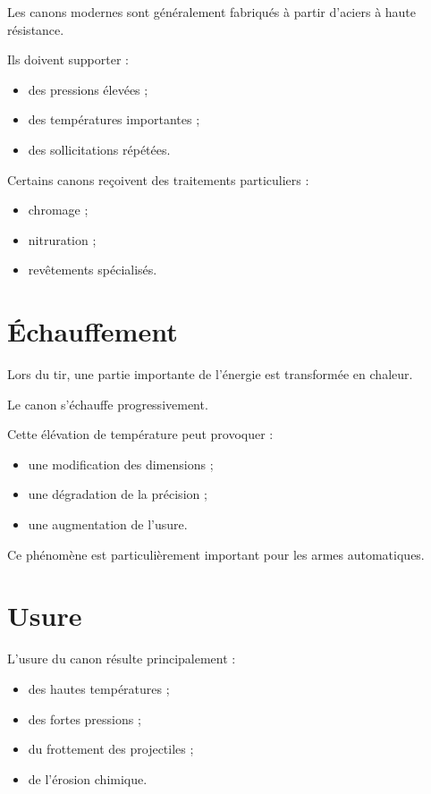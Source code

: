 Les canons modernes sont généralement fabriqués à partir d'aciers à haute
résistance.

Ils doivent supporter :

\begin{itemize}
    \item des pressions élevées ;
    \item des températures importantes ;
    \item des sollicitations répétées.
\end{itemize}

Certains canons reçoivent des traitements particuliers :

\begin{itemize}
    \item chromage ;
    \item nitruration ;
    \item revêtements spécialisés.
\end{itemize}

\section{Échauffement}

Lors du tir, une partie importante de l'énergie est transformée en chaleur.

Le canon s'échauffe progressivement.

Cette élévation de température peut provoquer :

\begin{itemize}
    \item une modification des dimensions ;
    \item une dégradation de la précision ;
    \item une augmentation de l'usure.
\end{itemize}

Ce phénomène est particulièrement important pour les armes automatiques.

\section{Usure}

L'usure du canon résulte principalement :

\begin{itemize}
    \item des hautes températures ;
    \item des fortes pressions ;
    \item du frottement des projectiles ;
    \item de l'érosion chimique.
\end{itemize}

